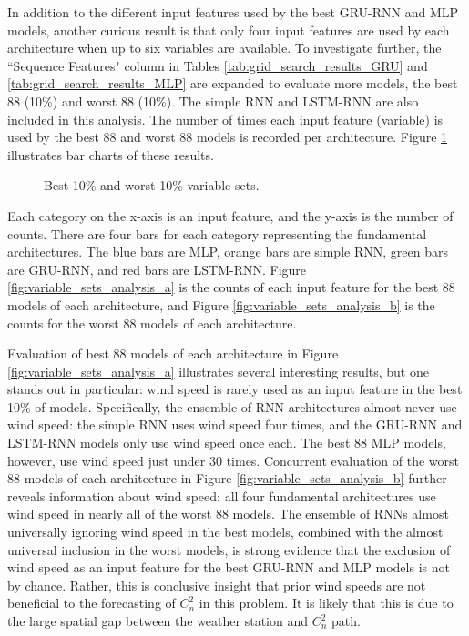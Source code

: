 In addition to the different input features used by the best \ac{GRU-RNN} and \ac{MLP} models, another curious result is that only four input features are used by each architecture when up to six variables are available. To investigate further, the ``Sequence Features" column in Tables \ref{tab:grid_search_results_GRU} and \ref{tab:grid_search_results_MLP} are expanded to evaluate more models, the best 88 (10\%) and worst 88 (10\%). The simple \ac{RNN} and \ac{LSTM-RNN} are also included in this analysis. The number of times each input feature (variable) is used by the best 88 and worst 88 models is recorded per architecture. Figure \ref{fig:variable_sets_analysis} illustrates bar charts of these results.
\begin{figure}[h!]
	\centering
	\hfill
	\caption{Best 10\% and worst 10\% variable sets.}
	\label{fig:variable_sets_analysis}
\end{figure}
Each category on the x-axis is an input feature, and the y-axis is the number of counts. There are four bars for each category representing the fundamental architectures. The blue bars are \ac{MLP}, orange bars are simple \ac{RNN}, green bars are \ac{GRU-RNN}, and red bars are \ac{LSTM-RNN}. Figure \ref{fig:variable_sets_analysis_a} is the counts of each input feature for the best 88 models of each architecture, and Figure \ref{fig:variable_sets_analysis_b} is the counts for the worst 88 models of each architecture.

Evaluation of best 88 models of each architecture in Figure \ref{fig:variable_sets_analysis_a} illustrates several interesting results, but one stands out in particular: wind speed is rarely used as an input feature in the best 10\% of models. Specifically, the ensemble of \ac{RNN} architectures almost never use wind speed: the simple \ac{RNN} uses wind speed four times, and the \ac{GRU-RNN} and \ac{LSTM-RNN} models only use wind speed once each. The best 88 \ac{MLP} models, however, use wind speed just under 30 times. Concurrent evaluation of the worst 88 models of each architecture in Figure \ref{fig:variable_sets_analysis_b} further reveals information about wind speed: all four fundamental architectures use wind speed in nearly all of the worst 88 models. The ensemble of \ac{RNN}s almost universally ignoring wind speed in the best models, combined with the almost universal inclusion in the worst models, is strong evidence that the exclusion of wind speed as an input feature for the best \ac{GRU-RNN} and \ac{MLP} models is not by chance. Rather, this is conclusive insight that prior wind speeds are not beneficial to the forecasting of $C_{n}^{2}$ in this problem. It is likely that this is due to the large spatial gap between the weather station and $C_{n}^{2}$ path. 

